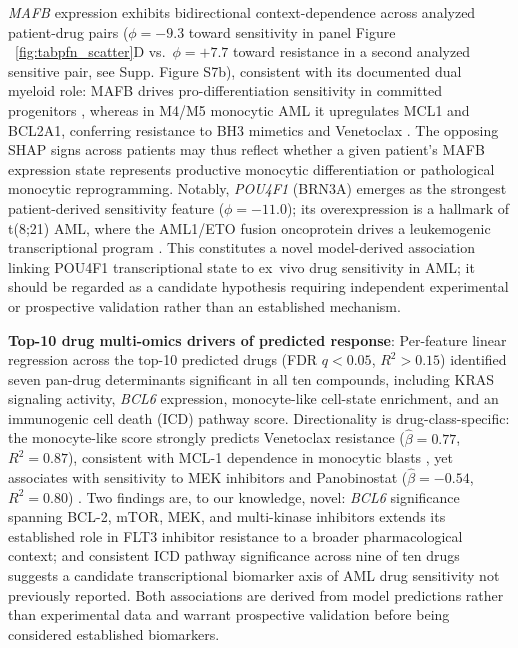 \documentclass[pdflatex,sn-mathphys-num]{sn-jnl}
\theoremstyle{thmstyleone}
\theoremstyle{thmstyletwo}
\theoremstyle{thmstylethree}
\begin{document}
\textit{MAFB} expression exhibits bidirectional context-dependence across analyzed patient-drug pairs ($\phi = -9.3$ toward sensitivity in panel Figure ~\ref{fig:tabpfn_scatter}D vs.\ $\phi = +7.7$ toward resistance in a second analyzed sensitive pair, see Supp. Figure S7b), consistent with its documented dual myeloid role: MAFB drives pro-differentiation sensitivity in committed progenitors \cite{ventura2025mafb}, whereas in M4/M5 monocytic AML it upregulates MCL1 and BCL2A1, conferring resistance to BH3 mimetics and Venetoclax \cite{allen2025venetoclax}. The opposing SHAP signs across patients may thus reflect whether a given patient's MAFB expression state represents productive monocytic differentiation or pathological monocytic reprogramming. Notably, \textit{POU4F1} (BRN3A) emerges as the strongest patient-derived sensitivity feature ($\phi = -11.0$); its overexpression is a hallmark of t(8;21) AML, where the AML1/ETO fusion oncoprotein drives a leukemogenic transcriptional program \cite{dunne2010pou4f1, fortier2010pou4f1}. This constitutes a novel model-derived association linking POU4F1 transcriptional state to ex~vivo drug sensitivity in AML; it should be regarded as a candidate hypothesis requiring independent experimental or prospective validation rather than an established mechanism. %

\textbf{Top-10 drug multi-omics drivers of predicted response}: Per-feature linear regression across the top-10 predicted drugs (FDR $q < 0.05$, $R^2 > 0.15$) identified seven pan-drug determinants significant in all ten compounds, including KRAS signaling activity, \textit{BCL6} expression, monocyte-like cell-state enrichment, and an immunogenic cell death (ICD) pathway score. Directionality is drug-class-specific: the monocyte-like score strongly predicts Venetoclax resistance ($\hat{\beta} = 0.77$, $R^2 = 0.87$), consistent with MCL-1 dependence in monocytic blasts \cite{kennedy2026ras, mohanty2024venetoclax, allen2025venetoclax}, yet associates with sensitivity to MEK inhibitors and Panobinostat ($\hat{\beta} = -0.54$, $R^2 = 0.80$) \cite{pedicona2022lsd1, burgess2017kras}. Two findings are, to our knowledge, novel: \textit{BCL6} significance spanning BCL-2, mTOR, MEK, and multi-kinase inhibitors extends its established role in FLT3 inhibitor resistance \cite{zavorka2021bcl6} to a broader pharmacological context; and consistent ICD pathway significance across nine of ten drugs suggests a candidate transcriptional biomarker axis of AML drug sensitivity not previously reported. Both associations are derived from model predictions rather than experimental data and warrant prospective validation before being considered established biomarkers.
\end{document}
